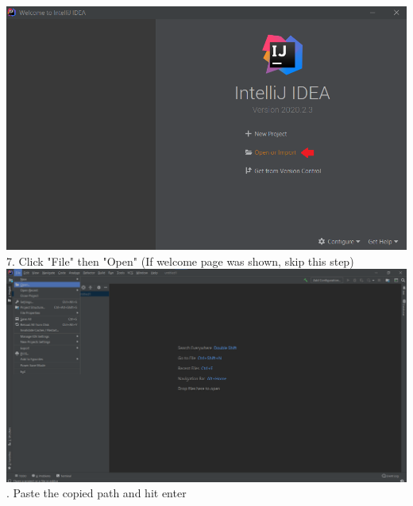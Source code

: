 \begin{flushleft}
    \vspace{5mm}
    \includegraphics[width=16.5cm]{Report/root/step3.1.png}\\
    7. Click "File" then "Open" (If welcome page was shown, skip this step)\\
    \vspace{5mm}
    \includegraphics[width=16.5cm]{Report/root/step3.2.png}\\
    . Paste the copied path and hit enter\\
    \vspace{5mm}

\end{flushleft}
